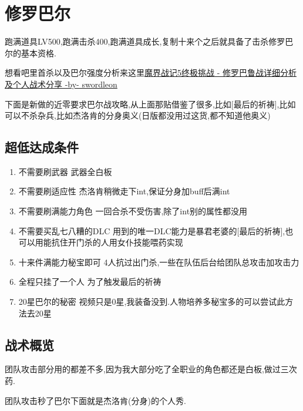	\newpage

	\section{修罗巴尔}

	跑满道具LV500,跑满击杀400,跑满道具成长,复制十来个之后就具备了击杀修罗巴尔的基本资格.

	想看吧里首杀以及巴尔强度分析来这里\href{http://tieba.baidu.com/p/3949061316}{魔界战记5终极挑战 - 修罗巴鲁战详细分析及个人战术分享 -by- swordleon }

	下面是新做的近零要求巴尔战攻略,从上面那贴借鉴了很多,比如[最后的祈祷],比如可以不杀杂兵,比如杰洛肯的分身奥义(日版都没用过这货,都不知道他奥义)

	\subsection{超低达成条件}
	\begin{enumerate}
		\item{不需要刷武器}
		武器全白板

		\item{不需要刷适应性}
		杰洛肯稍微走下int,保证分身加buff后满int

		\item{不需要刷满能力角色}
		一回合杀不受伤害,除了int别的属性都没用

		\item{不需要买乱七八糟的DLC}
		用到的唯一DLC能力是暴君老婆的[最后的祈祷],也可以用能抗住开门杀的人用女仆技能喂药实现

		\item{十来件满能力秘宝即可}
		4人抗过出门杀,一些在队伍后台给团队总攻击加攻击力

		\item{全程只挂了一个人}
		为了触发最后的祈祷

		\item{20星巴尔的秘密}
		视频只是0星,我装备没到.人物培养多秘宝多的可以尝试此方法去20星
	\end{enumerate}

	\subsection{战术概览}

	团队攻击部分用{\color{red}{大魔拳超魔流刷过全职业}}的都差不多,因为我大部分吃了全职业的角色都还是白板,做过三次药.

	团队攻击秒了巴尔下面就是杰洛肯(分身)的个人秀.

